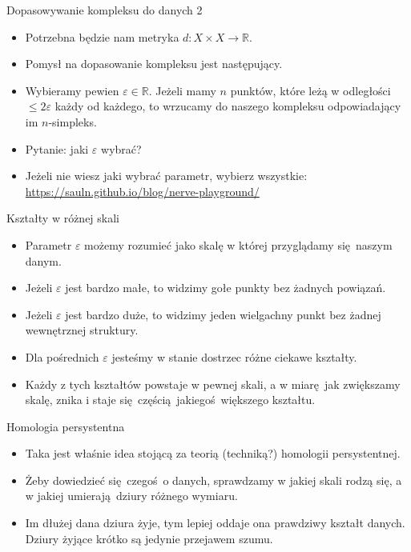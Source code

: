 \documentclass{beamer}
\begin{document}
\begin{frame}{Dopasowywanie kompleksu do danych 2}
\begin{itemize}
	\item Potrzebna będzie nam metryka $d: X \times X \to \mathbb{R}$.
	\item Pomysł na dopasowanie kompleksu jest następujący.
	\item Wybieramy pewien $\varepsilon \in \mathbb{R}$. Jeżeli mamy $n$ punktów, które leżą w odległości $\leq 2\varepsilon$ każdy od każdego, to wrzucamy do naszego kompleksu odpowiadający im $n$-simpleks.
	\item Pytanie: jaki $\varepsilon$ wybrać?
	\item Jeżeli nie wiesz jaki wybrać parametr, wybierz wszystkie: \url{https://sauln.github.io/blog/nerve-playground/}
\end{itemize}
\end{frame}

\begin{frame}{Kształty w różnej skali}
\begin{itemize}
	\item Parametr $\varepsilon$ możemy rozumieć jako skalę w której przyglądamy się naszym danym.
	\item Jeżeli $\varepsilon$ jest bardzo małe, to widzimy gołe punkty bez żadnych powiązań.
	\item Jeżeli $\varepsilon$ jest bardzo duże, to widzimy jeden wielgachny punkt bez żadnej wewnętrznej struktury.
	\item Dla pośrednich $\varepsilon$ jesteśmy w stanie dostrzec różne ciekawe kształty.
	\item Każdy z tych kształtów powstaje w pewnej skali, a w miarę jak zwiększamy skalę, znika i staje się częścią jakiegoś większego kształtu.
\end{itemize}
\end{frame}

\begin{frame}{Homologia persystentna}
\begin{itemize}
	\item Taka jest właśnie idea stojącą za teorią (techniką?) homologii persystentnej.
	\item Żeby dowiedzieć się czegoś o danych, sprawdzamy w jakiej skali rodzą się, a w jakiej umierają dziury różnego wymiaru.
	\item Im dłużej dana dziura żyje, tym lepiej oddaje ona prawdziwy kształt danych. Dziury żyjące krótko są jedynie przejawem szumu.
\end{itemize}
\end{frame}
\end{document}
